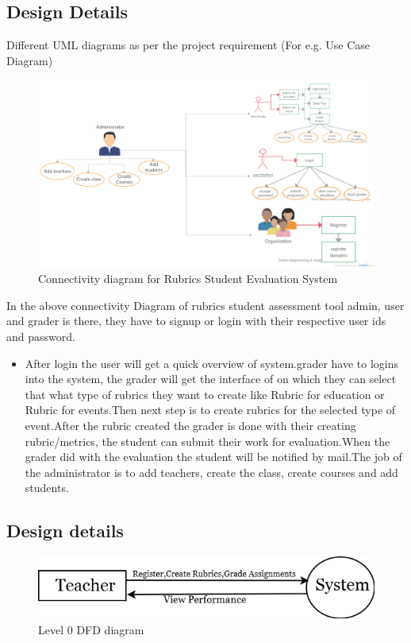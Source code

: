 \subsection{Design Details}

Different UML diagrams as per the project requirement (For e.g. Use Case Diagram)\\
\begin{figure}[!h]
\centering
\hfill\includegraphics[scale=.22]{project/images/rubrics}\hspace*{\fill}
\caption{Connectivity diagram for Rubrics Student Evaluation System}
\end{figure}

In the above connectivity Diagram of rubrics student assessment tool admin, user and grader is there, they have to signup or login with their respective user ids and password.
\begin{itemize}
  \item After login the user will get a quick overview of system.grader have to logins into the system, the grader will get the interface of on which they can select that what type of rubrics they want to create like Rubric for education or Rubric for events.Then next step is to create rubrics for the selected type of event.After the rubric created the grader is done with their creating rubric/metrics, the student can submit their work for evaluation.When the grader did with the evaluation the student will be notified by mail.The job of the administrator is to add teachers, create the class, create courses and add students.
\end{itemize}

\subsection{Design details}
\begin{figure}[!h]

\hfill\includegraphics[scale=.65]{project/images/cfd}\hspace*{\fill}
\caption{Level 0 DFD diagram}
\end{figure}

